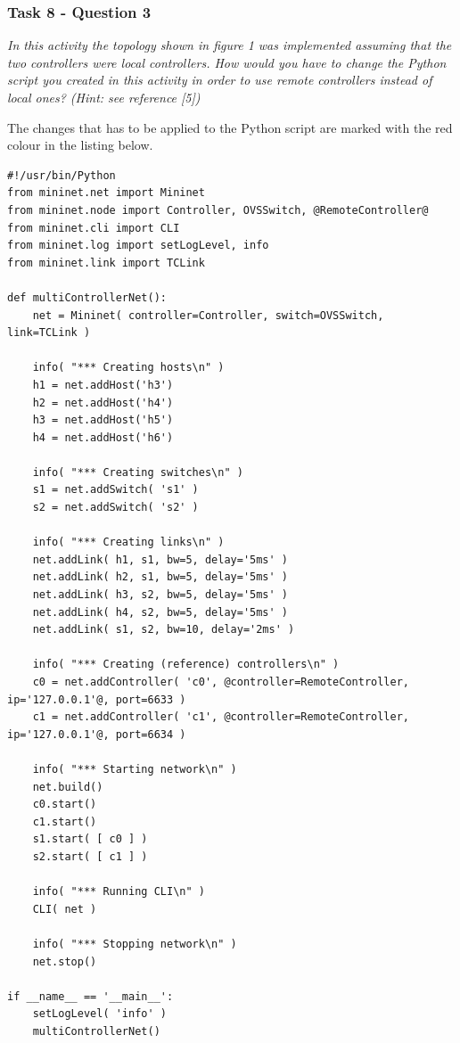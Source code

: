 \subsubsection*{Task 8 - Question 3}
\textit{In this activity the topology shown in figure 1 was implemented
assuming that the two controllers were local controllers. How
would you have to change the Python script you created in this
activity in order to use remote controllers instead of local ones?
(Hint: see reference [5])}

The changes that has to be applied to the Python script are marked with the red
colour in the listing below.

\begin{minipage}{\linewidth}
\begin{lstlisting}
#!/usr/bin/Python
from mininet.net import Mininet
from mininet.node import Controller, OVSSwitch, @RemoteController@
from mininet.cli import CLI
from mininet.log import setLogLevel, info
from mininet.link import TCLink

def multiControllerNet():
    net = Mininet( controller=Controller, switch=OVSSwitch, link=TCLink )

    info( "*** Creating hosts\n" )
    h1 = net.addHost('h3')
    h2 = net.addHost('h4')
    h3 = net.addHost('h5')
    h4 = net.addHost('h6')

    info( "*** Creating switches\n" )
    s1 = net.addSwitch( 's1' )
    s2 = net.addSwitch( 's2' )

    info( "*** Creating links\n" )
    net.addLink( h1, s1, bw=5, delay='5ms' )
    net.addLink( h2, s1, bw=5, delay='5ms' )
    net.addLink( h3, s2, bw=5, delay='5ms' )
    net.addLink( h4, s2, bw=5, delay='5ms' )
    net.addLink( s1, s2, bw=10, delay='2ms' )

    info( "*** Creating (reference) controllers\n" )
    c0 = net.addController( 'c0', @controller=RemoteController, ip='127.0.0.1'@, port=6633 )
    c1 = net.addController( 'c1', @controller=RemoteController, ip='127.0.0.1'@, port=6634 )

    info( "*** Starting network\n" )
    net.build()
    c0.start()
    c1.start()
    s1.start( [ c0 ] )
    s2.start( [ c1 ] )

    info( "*** Running CLI\n" )
    CLI( net )

    info( "*** Stopping network\n" )
    net.stop()

if __name__ == '__main__':
    setLogLevel( 'info' )
    multiControllerNet()
\end{lstlisting}
\end{minipage}

